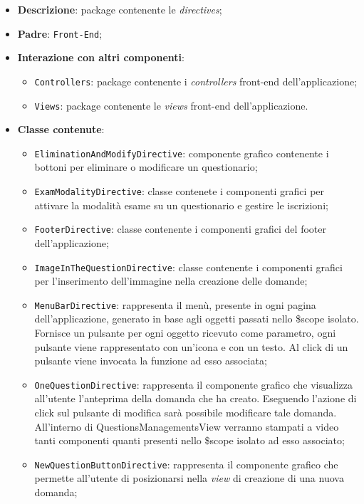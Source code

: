 \begin{itemize}
	\item \textbf{Descrizione}: package contenente le \textit{directives};
	\item \textbf{Padre}: \texttt{Front-End};
	\item \textbf{Interazione con altri componenti}:
	\begin{itemize}
		\item \texttt{Controllers}: package contenente i \textit{controllers} front-end dell'applicazione;
		\item \texttt{Views}: package contenente le \textit{views} front-end dell'applicazione.
	\end{itemize}
	\item \textbf{Classe contenute}:
	\begin{itemize}
		\item \texttt{EliminationAndModifyDirective}: componente grafico contenente i bottoni per eliminare o modificare un questionario;
		\item \texttt{ExamModalityDirective}: classe contenete i componenti grafici per attivare la modalità esame su un questionario e gestire le iscrizioni;
		\item \texttt{FooterDirective}: classe contenente i componenti grafici del footer dell'applicazione;
		\item \texttt{ImageInTheQuestionDirective}: classe contenente i componenti grafici per l'inserimento dell'immagine	nella creazione delle domande;
		\item \texttt{MenuBarDirective}: rappresenta il menù, presente in ogni pagina dell'applicazione, generato in base agli oggetti passati nello \$scope isolato. Fornisce un pulsante per ogni oggetto ricevuto come parametro, ogni pulsante viene rappresentato con un'icona e con un testo. Al click di un pulsante viene invocata la funzione ad esso associata;
		\item \texttt{OneQuestionDirective}: rappresenta il componente grafico che visualizza all'utente l'anteprima della domanda che ha creato. Eseguendo l'azione di click sul pulsante di modifica sarà possibile modificare tale domanda. All'interno di QuestionsManagementsView verranno stampati a video tanti componenti quanti presenti nello \$scope isolato ad esso associato;
		\item \texttt{NewQuestionButtonDirective}: rappresenta il componente grafico che permette all'utente di posizionarsi nella \textit{view} di creazione di una nuova domanda;

\end{itemize}
\end{itemize}
